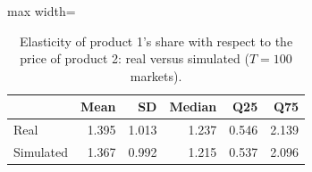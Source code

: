 \begin{table}[H]
\centering\small
\caption{Elasticity of product 1's share with respect to the price of product 2: real versus simulated ($T=100$ markets).}\label{tab:q8d_cell_12}
\begin{adjustbox}{max width=\linewidth}
\begin{tabular}{lrrrrr}
\toprule
 & Mean & SD & Median & Q25 & Q75 \\
\midrule
Real & 1.395 & 1.013 & 1.237 & 0.546 & 2.139 \\
Simulated & 1.367 & 0.992 & 1.215 & 0.537 & 2.096 \\
\bottomrule
\end{tabular}
\end{adjustbox}
\par\vspace{3pt}{\footnotesize Element $(1,2)$ of the elasticity matrix $\partial s_j/\partial p_k\cdot p_k/s_j$ across the 100 markets; simulated uses the Q8c estimates, real uses the true parameters.}
\end{table}
